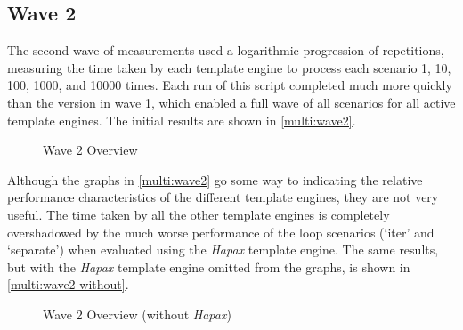 \subsection{Wave 2}
\label{comp:wave 2}

The second wave of measurements used a logarithmic progression of repetitions, measuring the time taken by each template engine to process each scenario 1, 10, 100, 1000, and 10000 times. Each run of this script completed much more quickly than the version in wave 1, which enabled a full wave of all scenarios for all active template engines. The initial results are shown in \autoref{multi:wave2}.

\begin{figure}[ht!]
\centering

\caption{\label{multi:wave2}Wave 2 Overview}
\end{figure}


Although the graphs in \autoref{multi:wave2} go some way to indicating the relative performance characteristics of the different template engines, they are not very useful. The time taken by all the other template engines is completely overshadowed by the much worse performance of the loop scenarios (`iter' and `separate') when evaluated using the \emph{Hapax} template engine. The same results, but with the \emph{Hapax} template engine omitted from the graphs, is shown in \autoref{multi:wave2-without}.

\begin{figure}[ht!]
\centering

\caption{\label{multi:wave2-without}Wave 2 Overview (without \emph{Hapax})}
\end{figure}

